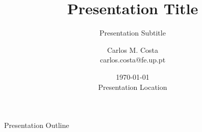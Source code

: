 





\title{Presentation Title}
\subtitle{Presentation Subtitle}
\author{Carlos M. Costa\texorpdfstring{\\{\ttfamily carlos.costa@fe.up.pt}}{}}
\date{\today\\{\small Presentation Location}}



\begin{frame}
	\titlepage
\end{frame}




\begin{frame}{Presentation Outline}
	\tableofcontents
\end{frame}











